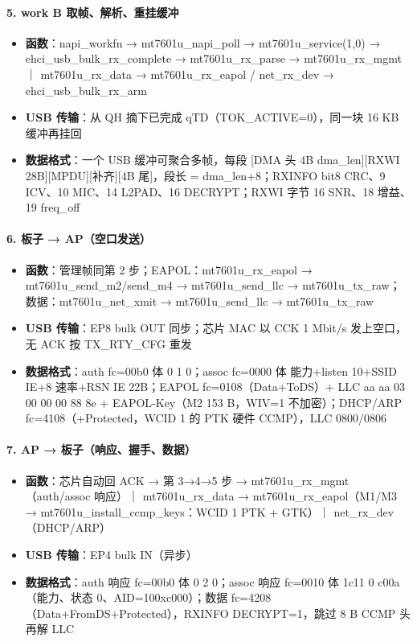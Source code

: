 \paragraph*{5. work B 取帧、解析、重挂缓冲}
\begin{itemize}[leftmargin=2em,itemsep=1pt]
\item \textbf{函数}：napi\_workfn → mt7601u\_napi\_poll → mt7601u\_service(1,0) → ehci\_usb\_bulk\_rx\_complete → mt7601u\_rx\_parse → mt7601u\_rx\_mgmt ｜ mt7601u\_rx\_data → mt7601u\_rx\_eapol / net\_rx\_dev → ehci\_usb\_bulk\_rx\_arm
\item \textbf{USB 传输}：从 QH 摘下已完成 qTD（TOK\_ACTIVE=0），同一块 16 KB 缓冲再挂回
\item \textbf{数据格式}：一个 USB 缓冲可聚合多帧，每段 [DMA 头 4B dma\_len][RXWI 28B][MPDU][补齐][4B 尾]，段长 = dma\_len+8；RXINFO bit8 CRC、9 ICV、10 MIC、14 L2PAD、16 DECRYPT；RXWI 字节 16 SNR、18 增益、19 freq\_off
\end{itemize}

\paragraph*{6. 板子 → AP（空口发送）}
\begin{itemize}[leftmargin=2em,itemsep=1pt]
\item \textbf{函数}：管理帧同第 2 步；EAPOL：mt7601u\_rx\_eapol → mt7601u\_send\_m2/send\_m4 → mt7601u\_send\_llc → mt7601u\_tx\_raw；数据：mt7601u\_net\_xmit → mt7601u\_send\_llc → mt7601u\_tx\_raw
\item \textbf{USB 传输}：EP8 bulk OUT 同步；芯片 MAC 以 CCK 1 Mbit/s 发上空口，无 ACK 按 TX\_RTY\_CFG 重发
\item \textbf{数据格式}：auth fc=00b0 体 0 1 0；assoc fc=0000 体 能力+listen 10+SSID IE+8 速率+RSN IE 22B；EAPOL fc=0108（Data+ToDS）+ LLC aa aa 03 00 00 00 88 8e + EAPOL-Key（M2 153 B，WIV=1 不加密）；DHCP/ARP fc=4108（+Protected，WCID 1 的 PTK 硬件 CCMP），LLC 0800/0806
\end{itemize}

\paragraph*{7. AP → 板子（响应、握手、数据）}
\begin{itemize}[leftmargin=2em,itemsep=1pt]
\item \textbf{函数}：芯片自动回 ACK → 第 3→4→5 步 → mt7601u\_rx\_mgmt（auth/assoc 响应）｜ mt7601u\_rx\_data → mt7601u\_rx\_eapol（M1/M3 → mt7601u\_install\_ccmp\_keys：WCID 1 PTK + GTK）｜ net\_rx\_dev（DHCP/ARP）
\item \textbf{USB 传输}：EP4 bulk IN（异步）
\item \textbf{数据格式}：auth 响应 fc=00b0 体 0 2 0；assoc 响应 fc=0010 体 1c11 0 c00a（能力、状态 0、AID=10\textbar{}0xc000）；数据 fc=4208（Data+FromDS+Protected），RXINFO DECRYPT=1，跳过 8 B CCMP 头再解 LLC
\end{itemize}

